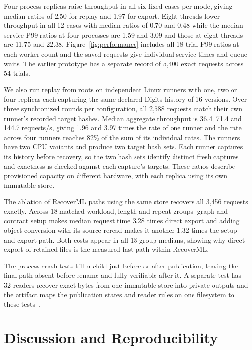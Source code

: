Four process replicas raise throughput in all six fixed cases per mode, giving median ratios of 2.50 for replay and 1.97 for export. Eight threads lower throughput in all 12 cases with median ratios of 0.70 and 0.48 while the median service P99 ratios at four processes are 1.59 and 3.09 and those at eight threads are 11.75 and 22.38. Figure~\ref{fig:performance} includes all 18 trial P99 ratios at each worker count and the saved requests give individual service times and queue waits. The earlier prototype has a separate record of 5,400 exact requests across 54 trials.

We also run replay from roots on independent Linux runners with one, two or four replicas each capturing the same declared Digits history of 16 versions. Over three synchronized rounds per configuration, all 2,688 requests match their own runner's recorded target hashes. Median aggregate throughput is 36.4, 71.4 and 144.7 requests/s, giving 1.96 and 3.97 times the rate of one runner and the rate across four runners reaches 82\% of the sum of its individual rates. The runners have two CPU variants and produce two target hash sets. Each runner captures its history before recovery, so the two hash sets identify distinct fresh captures and exactness is checked against each capture's targets. These ratios describe provisioned capacity on different hardware, with each replica using its own immutable store.

The ablation of RecoverML paths using the same store recovers all 3,456 requests exactly. Across 18 matched workload, length and repeat groups, graph and contract setup makes median request time 3.28 times direct export and adding object conversion with its source reread makes it another 1.32 times the setup and export path. Both costs appear in all 18 group medians, showing why direct export of retained files is the measured fast path within RecoverML.

The process crash tests kill a child just before or after publication, leaving the final path absent before rename and fully verifiable after it. A separate test has 32 readers recover exact bytes from one immutable store into private outputs and the artifact maps the publication states and reader rules on one filesystem to these tests~\cite{artifact}.

\section{Discussion and Reproducibility}
\label{sec:discussion}

